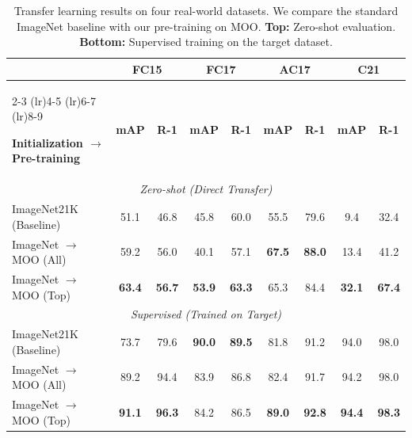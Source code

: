 \begin{table}[t]
    \centering
    \caption{
        Transfer learning results on four real-world datasets.
        We compare the standard ImageNet baseline with our pre-training on MOO.
        \textbf{Top:} Zero-shot evaluation.
        \textbf{Bottom:} Supervised training on the target dataset.
    }
    \label{tab:real}

    \scriptsize
    \setlength{\tabcolsep}{2pt}

    \begin{tabular}{l cc cc cc cc}
        \toprule

        & \multicolumn{2}{c}{\textbf{FC15}} & \multicolumn{2}{c}{\textbf{FC17}} & \multicolumn{2}{c}{\textbf{AC17}} & \multicolumn{2}{c}{\textbf{C21}} \\

        \cmidrule(lr){2-3}
        \cmidrule(lr){4-5}
        \cmidrule(lr){6-7}
        \cmidrule(lr){8-9}

        \textbf{Initialization $\rightarrow$ Pre-training} & \textbf{mAP}  & \textbf{R-1}  & \textbf{mAP}  & \textbf{R-1}  & \textbf{mAP}  & \textbf{R-1} & \textbf{mAP} & \textbf{R-1} \\

        \midrule
        \multicolumn{9}{c}{\textit{Zero-shot (Direct Transfer)}} \\
        \midrule

        ImageNet21K (Baseline)                             & 51.1          & 46.8          & 45.8          & 60.0          & 55.5          & 79.6          & 9.4           & 32.4          \\
        ImageNet $\rightarrow$ MOO (All)                   & 59.2          & 56.0          & 40.1          & 57.1          & \textbf{67.5} & \textbf{88.0} & 13.4          & 41.2          \\
        ImageNet $\rightarrow$ MOO (Top)                   & \textbf{63.4} & \textbf{56.7} & \textbf{53.9} & \textbf{63.3} & 65.3          & 84.4          & \textbf{32.1} & \textbf{67.4} \\

        \midrule
        \multicolumn{9}{c}{\textit{Supervised (Trained on Target)}} \\
        \midrule

        ImageNet21K (Baseline)                             & 73.7          & 79.6          & \textbf{90.0} & \textbf{89.5} & 81.8          & 91.2          & 94.0          & 98.0          \\
        ImageNet $\rightarrow$ MOO (All)                   & 89.2          & 94.4          & 83.9          & 86.8          & 82.4          & 91.7          & 94.2          & 98.0          \\
        ImageNet $\rightarrow$ MOO (Top)                   & \textbf{91.1} & \textbf{96.3} & 84.2          & 86.5          & \textbf{89.0} & \textbf{92.8} & \textbf{94.4} & \textbf{98.3} \\

        \bottomrule
    \end{tabular}
\end{table}
